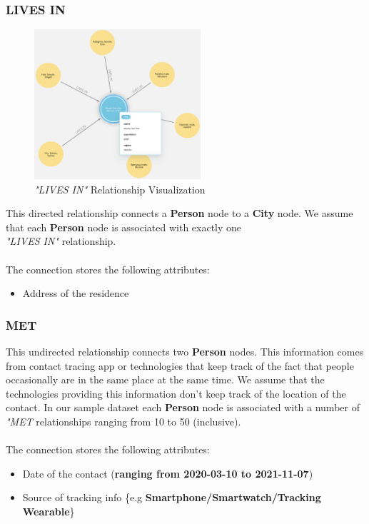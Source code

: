 \documentclass{article}[IEEEtran]
\begin{document}
\newpage 

\subsubsection{LIVES IN}

\begin{figure}
\vspace{-1.5cm}
\begin{center}
\includegraphics[width=0.55\textwidth, frame]{LIVES_IN.png}
\caption{\emph{"LIVES IN"} Relationship Visualization}
\end{center}
\end{figure}

This directed relationship connects a \textbf{Person} node to a \textbf{City} node. We assume that each \textbf{Person} node is associated with exactly one \\\emph{"LIVES IN"} relationship.
\\\\
The connection stores the following attributes:
\begin{itemize}
    \item Address of the residence
\end{itemize}

\vspace{4cm}

\subsubsection{MET}

This undirected relationship connects two \textbf{Person} nodes. This information comes from contact tracing app or technologies that keep track of the fact that people occasionally are in the same place at the same time. We assume that the technologies providing this information don't keep track of the location of the contact. In our sample dataset each \textbf{Person} node is associated with a number of \emph{"MET} relationships ranging from 10 to 50 (inclusive).
\\\\
The connection stores the following attributes:
\begin{itemize}
    \item Date of the contact (\textbf{ranging from 2020-03-10 to 2021-11-07})
    \item Source of tracking info \{e.g \textbf{Smartphone/Smartwatch/Tracking Wearable}\}
\end{itemize}
\end{document}
